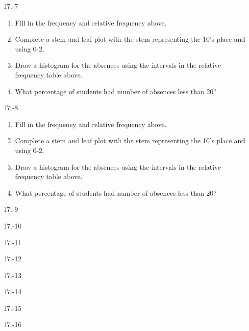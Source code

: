 \begin{exsol@solution}{17.-7}
\begin{enumerate}
  \item	Fill in the frequency and relative frequency above.
  \item	Complete a stem and leaf plot with the stem representing the 10's place and using 0-2.
  \item	Draw a histogram for the absences using the intervals in the relative frequency table above.
  \item	What percentage of students had number of absences less than 20?
\end{enumerate}

\end{exsol@solution}
\begin{exsol@solution}{17.-8}
\begin{enumerate}
  \item	Fill in the frequency and relative frequency above.
  \item	Complete a stem and leaf plot with the stem representing the 10's place and using 0-2.
  \item	Draw a histogram for the absences using the intervals in the relative frequency table above.
  \item	What percentage of students had number of absences less than 20?
\end{enumerate}

\end{exsol@solution}
\begin{exsol@solution}{17.-9}
\end{exsol@solution}
\begin{exsol@solution}{17.-10}
\end{exsol@solution}
\begin{exsol@solution}{17.-11}
\end{exsol@solution}
\begin{exsol@solution}{17.-12}
\end{exsol@solution}
\begin{exsol@solution}{17.-13}
\end{exsol@solution}
\begin{exsol@solution}{17.-14}
\end{exsol@solution}
\begin{exsol@solution}{17.-15}
\end{exsol@solution}
\begin{exsol@solution}{17.-16}
\end{exsol@solution}
